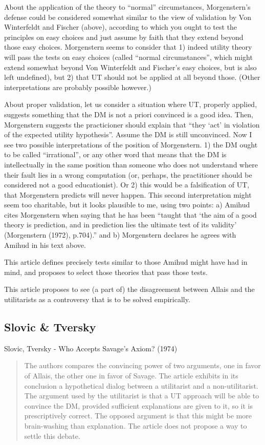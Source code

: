 \documentclass[preprint, french, english, 11pt, authoryear]{elsarticle}%
\begin{document}
About the application of the theory to “normal” circumstances, Morgenstern’s defense could be considered somewhat similar to the view of validation by Von Winterfeldt and Fischer (above), according to which you ought to test the principles on easy choices and just assume by faith that they extend beyond those easy choices. Morgenstern seems to consider that 1) indeed utility theory will pass the tests on easy choices (called “normal circumstances”, which might extend somewhat beyond Von Winterfeldt and Fischer’s easy choices, but is also left undefined), but 2) that UT should not be applied at all beyond those. (Other interpretations are probably possible however.)

About proper validation, let us consider a situation where UT, properly applied, suggests something that the DM is not a priori convinced is a good idea. Then, Morgenstern suggests the practicioner should explain that “they ‘act’ in violation of the expected utility hypothesis”. Assume the DM is still unconvinced. Now I see two possible interpretations of the position of Morgenstern. 1) the DM ought to be called “irrational”, or any other word that means that the DM is intellectually in the same position than someone who does not understand where their fault lies in a wrong computation (or, perhaps, the practitioner should be considered not a good educationist). Or 2) this would be a falsification of UT, that Morgenstern predicts will never happen. This second interpretation might seem too charitable, but it looks plausible to me, using two points: a) Amihud cites Morgenstern when saying that he has been “taught that ‘the aim of a good theory is prediction, and in prediction lies the ultimate test of its validity’ (Morgenstern (1972), p.704).” and b) Morgenstern declares he agrees with Amihud in his text above.

This article defines precisely tests similar to those Amihud might have had in mind, and proposes to select those theories that pass those tests.

This article proposes to see (a part of) the disagreement between Allais and the utilitarists as a controversy that is to be solved empirically.

\subsection{Slovic \& Tversky}
Slovic, Tversky - Who Accepts Savage's Axiom? (1974)

\begin{quote}
The authors compares the convincing power of two arguments, one in favor of Allais, the other one in favor of Savage. The article exhibits in its conclusion a hypothetical dialog between a utilitarist and a non-utilitarist. The argument used by the utilitarist is that a UT approach will be able to convince the DM, provided sufficient explanations are given to it, so it is prescriptively correct. The opposed argument is that this might be more brain-washing than explanation. The article does not propose a way to settle this debate.
\end{quote}
\end{document}
